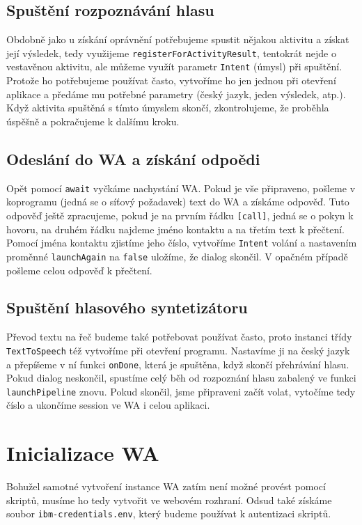 \subsection{Spuštění rozpoznávání hlasu}

Obdobně jako u získání
oprávnění potřebujeme spustit nějakou aktivitu a získat její výsledek, tedy
využijeme \texttt{registerForActivityResult}, tentokrát nejde o vestavěnou
aktivitu, ale můžeme využít parametr \texttt{Intent} (úmysl) při spuštění.
Protože ho potřebujeme používat často, vytvoříme ho jen jednou při otevření
aplikace a předáme mu potřebné parametry (český jazyk, jeden výsledek, atp.).
Když aktivita spuštěná s tímto úmyslem skončí, zkontrolujeme, že proběhla
úspěšně a pokračujeme k dalšímu kroku.

\subsection{Odeslání do WA a získání odpoědi}
Opět pomocí \texttt{await} vyčkáme nachystání WA. Pokud je vše připraveno,
pošleme v koprogramu (jedná se o síťový požadavek) text do WA a získáme odpověď.
Tuto odpověď ještě zpracujeme, pokud je na prvním řádku \texttt{[call]}, jedná
se o pokyn k hovoru, na druhém řádku najdeme jméno kontaktu a na třetím text k
přečtení. Pomocí jména kontaktu zjistíme jeho číslo, vytvoříme \texttt{Intent}
volání a nastavením proměnné \texttt{launchAgain} na \texttt{false} uložíme,
že dialog skončil. V opačném případě pošleme celou odpověď k přečtení.

\subsection{Spuštění hlasového syntetizátoru}

Převod textu na řeč budeme také potřebovat používat často, proto instanci
třídy \texttt{TextToSpeech} též vytvoříme při otevření programu. Nastavíme
ji na český jazyk a přepíšeme v ní funkci \texttt{onDone}, která je spuštěna,
když skončí přehrávání hlasu. Pokud dialog neskončil, spustíme celý běh
od rozpoznání hlasu zabalený ve funkci \texttt{launchPipeline} znovu. Pokud
skončil, jsme připraveni začít volat, vytočíme tedy číslo a ukončíme session ve
WA i celou aplikaci.

\section{Inicializace WA}

Bohužel samotné vytvoření instance WA zatím není možné provést pomocí skriptů,
musíme ho tedy vytvořit ve webovém rozhraní. Odsud také získáme soubor
\texttt{ibm-credentials.env}, který budeme používat k autentizaci skriptů.

